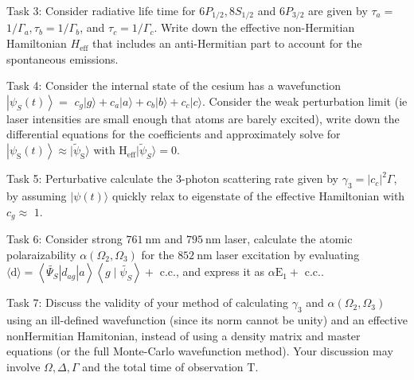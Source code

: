 \documentclass[hyperref, a4paper]{article}
\begin{document}
Task 3: Consider radiative life time for $6 P_{1 / 2}, 8 S_{1 / 2}$ and $6 P_{3 / 2}$ are given by $\tau_{a}=$ $1 / \Gamma_{a}, \tau_{b}=1 / \Gamma_{b}$, and $\tau_{c}=1 / \Gamma_{c} .$ Write down the effective non-Hermitian Hamiltonian ${H}_{\mathrm{eff}}$ that includes an anti-Hermitian part to account for the spontaneous emissions.

Task 4: Consider the internal state of the cesium has a wavefunction $\left|\psi_{S}(t)\right\rangle=$ $c_{g}|g\rangle+c_{a}|a\rangle+c_{b}|b\rangle+c_{c}|c\rangle$. Consider the weak perturbation limit (ie laser intensities are small enough that atoms are barely excited), write down the differential equations for the coefficients and approximately solve for $\left|\psi_\text{S}(t)\right\rangle \approx|\tilde{\psi}_\text{S}\rangle$ with $\mathrm{H}_{\mathrm{eff}}|{\tilde{\psi}_{S}}\rangle=0$.

Task 5: Perturbative calculate the 3-photon scattering rate given by $\gamma_{3}=\left|c_{c}\right|^{2} \Gamma$, by assuming $|\psi(t)\rangle$ quickly relax to eigenstate of the effective Hamiltonian with $c_{g} \approx$ $1 .$

Task 6: Consider strong $761 \mathrm{~nm}$ and $795 \mathrm{~nm}$ laser, calculate the atomic polaraizability $\alpha\left(\Omega_{2}, \Omega_{3}\right)$ for the $852 \mathrm{~nm}$ laser excitation by evaluating $\langle\mathrm{d}\rangle=\left\langle\widetilde{\Psi_{S}}\left|d_{a g}\right| a\right\rangle\left\langle g \mid \widetilde{\psi_{S}}\right\rangle+$ c.c., and express it as $\alpha \mathrm{E}_{1}+$ c.c..

Task 7: Discuss the validity of your method of calculating $\gamma_{3}$ and $\alpha\left(\Omega_{2}, \Omega_{3}\right)$ using an ill-defined wavefunction (since its norm cannot be unity) and an effective nonHermitian Hamitonian, instead of using a density matrix and master equations (or the full Monte-Carlo wavefunction method). Your discussion may involve $\Omega, \Delta, \Gamma$ and the total time of observation $\mathrm{T}$.
\end{document}
